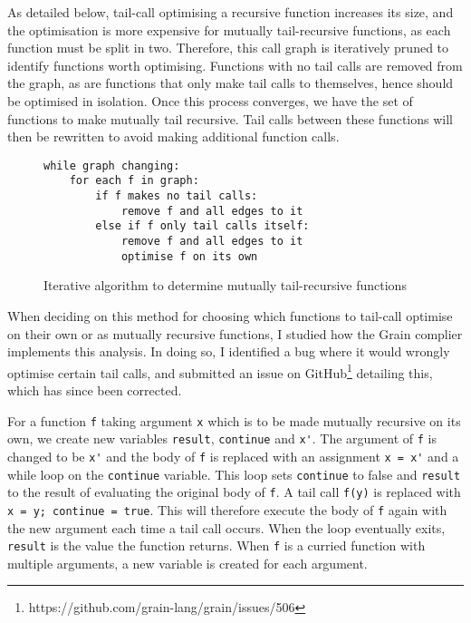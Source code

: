 As detailed below, tail-call optimising a recursive function increases its size, and the optimisation is more expensive for mutually tail-recursive functions, as each function must be split in two. Therefore, this call graph is iteratively pruned to identify functions worth optimising. Functions with no tail calls are removed from the graph, as are functions that only make tail calls to themselves, hence should be optimised in isolation. Once this process converges, we have the set of functions to make mutually tail recursive. Tail calls between these functions will then be rewritten to avoid making additional function calls.



\begin{figure}[H]
\centering
\begin{BVerbatim}
while graph changing:
    for each f in graph:
        if f makes no tail calls:
            remove f and all edges to it
        else if f only tail calls itself:
            remove f and all edges to it
            optimise f on its own
\end{BVerbatim}
\caption{Iterative algorithm to determine mutually tail-recursive functions}
\end{figure}


When deciding on this method for choosing which functions to tail-call optimise on their own or as mutually recursive functions, I studied how the Grain complier implements this analysis. In doing so, I identified a bug where it would wrongly optimise certain tail calls, and submitted an issue on GitHub\footnote{https://github.com/grain-lang/grain/issues/506} detailing this, which has since been corrected. %

For a function \verb|f| taking argument \verb|x| which is to be made mutually recursive on its own, we create new variables \verb|result|, \verb|continue| and \verb|x'|. The argument of \verb|f| is changed to be \verb|x'| and the body of \verb|f| is replaced with an assignment \verb|x = x'| and a while loop on the \verb|continue| variable. This loop sets \verb|continue| to false and \verb|result| to the result of evaluating the original body of \verb|f|. A tail call \verb|f(y)| is replaced with \verb|x = y; continue = true|. This will therefore execute the body of \verb|f| again with the new argument each time a tail call occurs. When the loop eventually exits, \verb|result| is the value the function returns. When \verb|f| is a curried function with multiple arguments, a new variable is created for each argument.

